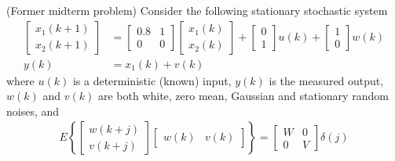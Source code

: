 \item
(Former midterm problem) Consider the following stationary stochastic system
\begin{align}
    \begin{bmatrix}
            x_1(k+1) \\
            x_2(k+1)
        \end{bmatrix} & = \begin{bmatrix}
            0.8 & 1 \\
            0 & 0
        \end{bmatrix} \begin{bmatrix}
            x_1(k) \\
            x_2(k)
        \end{bmatrix} + \begin{bmatrix}
            0 \\
            1
        \end{bmatrix} u(k) + \begin{bmatrix}
            1 \\
            0
        \end{bmatrix} w(k)
        \label{eq:sysx} \\
    y(k) & = x_1(k) + v(k) \nonumber
\end{align}
where
$u(k)$ is a deterministic (known) input,
$y(k)$ is the measured output,
$w(k)$ and $v(k)$ are both white, zero mean, Gaussian and stationary random noises, and
\begin{gather*}
    E \left \{ \begin{bmatrix} w(k+j) \\ v(k+j) \end{bmatrix} \begin{bmatrix} w(k) & v(k) \end{bmatrix} \right\}
        = \begin{bmatrix} W & 0 \\ 0 & V \end{bmatrix} \delta(j)
\end{gather*}

